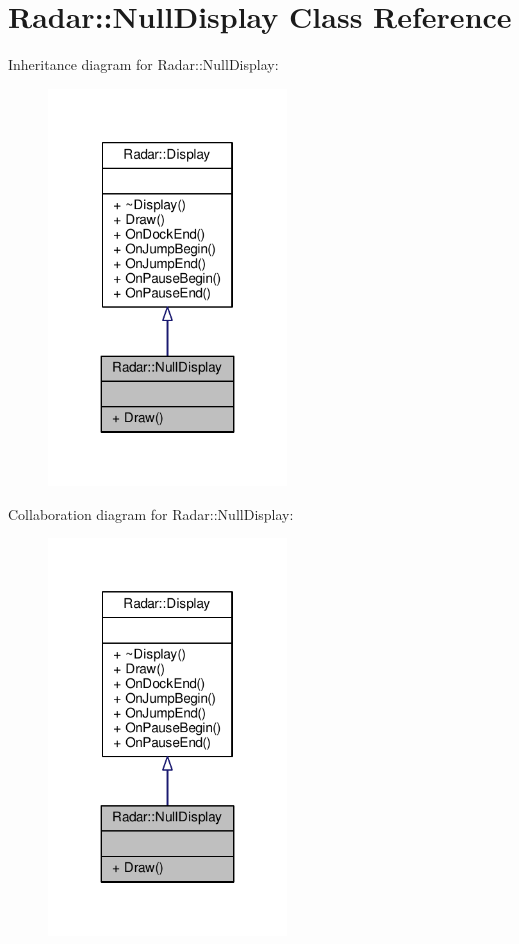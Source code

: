 \hypertarget{classRadar_1_1NullDisplay}{}\section{Radar\+:\+:Null\+Display Class Reference}
\label{classRadar_1_1NullDisplay}


Inheritance diagram for Radar\+:\+:Null\+Display\+:
\nopagebreak
\begin{figure}[H]
\begin{center}
\leavevmode
\includegraphics[width=179pt]{d5/df8/classRadar_1_1NullDisplay__inherit__graph}
\end{center}
\end{figure}


Collaboration diagram for Radar\+:\+:Null\+Display\+:
\nopagebreak
\begin{figure}[H]
\begin{center}
\leavevmode
\includegraphics[width=179pt]{d9/d39/classRadar_1_1NullDisplay__coll__graph}
\end{center}
\end{figure}
